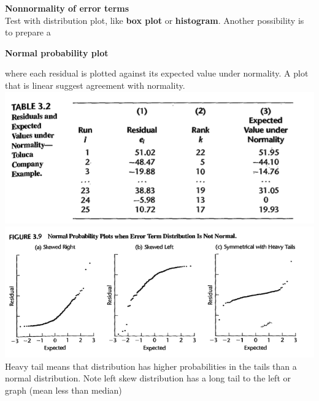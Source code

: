 \documentclass[11pt]{article}
\begin{document}
\begin{defn*}
    \textbf{Nonnormality of error terms} \\
    Test with distribution plot, like \textbf{box plot} or \textbf{histogram}. Another possibility is to prepare a 
    \begin{center}
        \textbf{Normal probability plot}
    \end{center}
    where each residual is plotted against its expected value under normality. A plot that is linear suggest agreement with normality. \\
    \includegraphics[width=\textwidth]{normal_prob_plot1.png} \\ 
    \includegraphics[width=\textwidth]{normal_prob_plot2.png} \\ 
    Heavy tail means that distribution has higher probabilities in the tails than a normal distribution. Note left skew distribution has a long tail to the left or graph (mean less than median)
\end{defn*}
\end{document}

